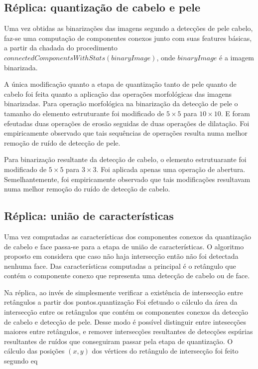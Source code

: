 \documentclass[journal,onecolumn]{IEEEtran}
\begin{document}
	\subsection{Réplica: quantização de cabelo e pele}
	
	Uma vez obtidas as binarizações das imagens segundo a detecções de pele cabelo, faz-se uma computação de componentes conexos junto com suas features básicas, a partir da chadada do procedimento $connectedComponentsWithStats(binaryImage)$, onde $binaryImage$ é a imagem binarizada.
	
	A única modificação quanto a etapa de quantização tanto de pele quanto de cabelo foi feita quanto a aplicação das operações morfológicas das imagens binarizadas.
	Para operação morfológica na binarização da detecção de pele o tamanho do elemento estruturante foi modificado de $5 \times 5$ para $10 \times 10$.
	E foram efeutadas duas operações de erosão seguidas de duas operações de dilatação. 
	Foi empiricamente observado que tais sequências de operações resulta numa melhor remoção de ruído de detecção de pele.

	Para binarização resultante da detecção de cabelo, o elemento estrutuarante foi modificado de $5 \times 5$ para $3 \times 3$.
	 Foi aplicada apenas uma operação de abertura.
	 Semelhantemente, foi empiricamente observado que tais modificações resultavam numa melhor remoção do ruído de detecção de cabelo.
	 
	 \subsection{Réplica: união de características}
	 
	Uma vez computadas as características dos componentes conexos da quantização de cabelo e face passa-se para a etapa de união de características.
	O algoritmo proposto em \cite{chen2007simple} considera que caso não haja intersecção então não foi detectada nenhuma face.
	Das características computadas a principal é o retângulo que contém o componente conexo que representa uma detecção de cabelo ou de face.
	
	Na réplica, ao invés de simplesmente verificar a existência de intersecção entre retângulos a partir dos pontos.quantização
	Foi efetuado o cálculo da área da intersecção entre os retângulos que contém os componentes conexos da detecção de cabelo e detecção de pele.
	Desse modo é possível distinguir entre intesecções maiores entre retângulos, e remover intersecções resultantes de detecções espúrias resultantes de ruídos que conseguiram passar pela etapa de quantização.
	O cálculo das posições $(x,y)$ dos vértices do retângulo de intersecção foi feito segundo eq
	 
\end{document}
